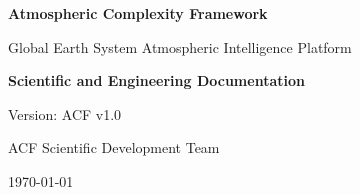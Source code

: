 \begin{titlepage}

\centering

\vspace*{2cm}

{\Huge
\textbf{Atmospheric Complexity Framework}\\
}

\vspace{1cm}

{\Large
Global Earth System Atmospheric Intelligence Platform
}

\vspace{2cm}


\textbf{Scientific and Engineering Documentation}


\vfill


Version:
ACF v1.0


\vspace{1cm}

ACF Scientific Development Team


\vspace{1cm}

\today


\end{titlepage}
